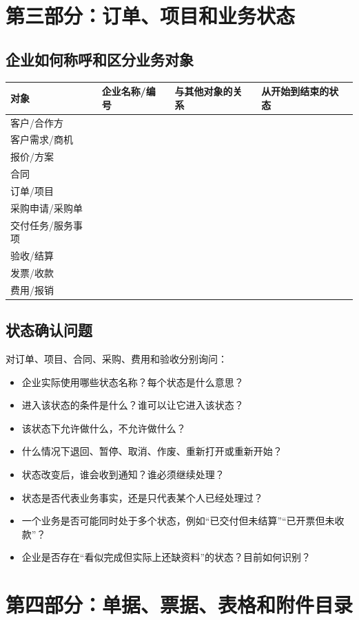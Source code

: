 \documentclass[UTF8,a4paper,11pt]{ctexart}
\begin{document}
\section{第三部分：订单、项目和业务状态}
\subsection{企业如何称呼和区分业务对象}
\begin{longtable}{p{}p{}p{}p{}}
\toprule
对象 & 企业名称/编号 & 与其他对象的关系 & 从开始到结束的状态 \\
\midrule
客户/合作方 & & & \\
客户需求/商机 & & & \\
报价/方案 & & & \\
合同 & & & \\
订单/项目 & & & \\
采购申请/采购单 & & & \\
交付任务/服务事项 & & & \\
验收/结算 & & & \\
发票/收款 & & & \\
费用/报销 & & & \\
\bottomrule
\end{longtable}

\subsection{状态确认问题}
对订单、项目、合同、采购、费用和验收分别询问：
\begin{itemize}
  \item 企业实际使用哪些状态名称？每个状态是什么意思？
  \item 进入该状态的条件是什么？谁可以让它进入该状态？
  \item 该状态下允许做什么，不允许做什么？
  \item 什么情况下退回、暂停、取消、作废、重新打开或重新开始？
  \item 状态改变后，谁会收到通知？谁必须继续处理？
  \item 状态是否代表业务事实，还是只代表某个人已经处理过？
  \item 一个业务是否可能同时处于多个状态，例如“已交付但未结算”“已开票但未收款”？
  \item 企业是否存在“看似完成但实际上还缺资料”的状态？目前如何识别？
\end{itemize}

\section{第四部分：单据、票据、表格和附件目录}
\end{document}
